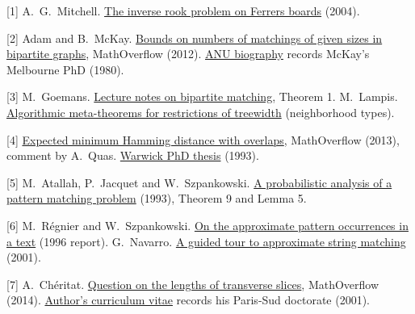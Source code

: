 \documentclass[12pt,letterpaper]{article}
\newcommand{\head}[1]{\par\vspace{5pt}{\large\bfseries\color{dark}#1}\par}
\newcommand{\src}[2]{\href{#1}{#2}}
\begin{document}
\head{Sources}
{\small\setlength{\parskip}{3pt}
[1] A.\ G.\ Mitchell. \src{https://arxiv.org/abs/math/0407007}{The inverse rook problem on Ferrers boards} (2004).

[2] Adam and B.\ McKay. \src{https://mathoverflow.net/questions/88547}{Bounds on numbers of matchings of given sizes in bipartite graphs}, MathOverflow (2012). \src{https://comp.anu.edu.au/people/brendan-mckay/}{ANU biography} records McKay's Melbourne PhD (1980).

[3] M.\ Goemans. \src{https://math.mit.edu/~goemans/18433S07/matching-notes.pdf}{Lecture notes on bipartite matching}, Theorem 1. M.\ Lampis. \src{https://www.csc.kth.se/~mlampis/papers/metatheorems.pdf}{Algorithmic meta-theorems for restrictions of treewidth} (neighborhood types).

[4] \src{https://mathoverflow.net/questions/128755}{Expected minimum Hamming distance with overlaps}, MathOverflow (2013), comment by A.\ Quas. \src{https://wrap.warwick.ac.uk/id/eprint/58569/}{Warwick PhD thesis} (1993).

[5] M.\ Atallah, P.\ Jacquet and W.\ Szpankowski. \src{https://doi.org/10.1002/rsa.3240040206}{A probabilistic analysis of a pattern matching problem} (1993), Theorem 9 and Lemma 5.

[6] M.\ R\'egnier and W.\ Szpankowski. \src{https://docs.lib.purdue.edu/cstech/1337/}{On the approximate pattern occurrences in a text} (1996 report). G.\ Navarro. \src{https://doi.org/10.1145/375360.375365}{A guided tour to approximate string matching} (2001).

[7] A.\ Ch\'eritat. \src{https://mathoverflow.net/questions/184507}{Question on the lengths of transverse slices}, MathOverflow (2014). \src{https://www.math.univ-toulouse.fr/~cheritat/CV-court-2022.pdf}{Author's curriculum vitae} records his Paris-Sud doctorate (2001).
}
\end{document}
